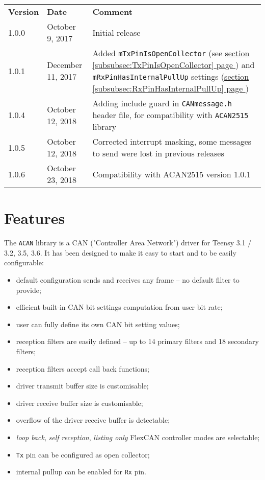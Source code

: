 \documentclass[10pt, a4paper, obeyspaces, openany]{extarticle}
\newcommand\refSubsubsectionPage[1]{\hyperref[subsubsec:#1]{section \ref*{subsubsec:#1} page \pageref{subsubsec:#1}}}
\begin{document}
\begin{center}
  \begin{tabular}{llp{10cm}}
    \textbf{Version} & \textbf{Date} & \textbf{Comment}\\
    1.0.0 & October 9, 2017 & Initial release \\
    1.0.1 & December 11, 2017 & Added \texttt{mTxPinIsOpenCollector} (see \refSubsubsectionPage{TxPinIsOpenCollector}) and \texttt{mRxPinHasInternalPullUp} settings (\refSubsubsectionPage{RxPinHasInternalPullUp}) \\
    1.0.4 & October 12, 2018 & Adding include guard in \texttt{CANmessage.h} header file, for compatibility with \texttt{ACAN2515} library\\
    1.0.5 & October 12, 2018 & Corrected interrupt masking, some messages to send were lost in previous releases \\
    1.0.6 & October 23, 2018 & Compatibility with ACAN2515 version 1.0.1
  \end{tabular}
\end{center}

\section{Features}

The \texttt{ACAN} library is a CAN ("Controller Area Network") driver for Teensy 3.1 / 3.2, 3.5, 3.6. It has been designed to make it easy to start and to be easily configurable:
\begin{itemize}
  \item default configuration sends and receives any frame -- no default filter to provide;
  \item efficient built-in CAN bit settings computation from user bit rate;
  \item user can fully define its own CAN bit setting values;
  \item reception filters are easily defined -- up to 14 primary filters and 18 secondary filters;
  \item reception filters accept call back functions;
  \item driver transmit buffer size is customisable;
  \item driver receive buffer size is customisable;
  \item overflow of the driver receive buffer is detectable;
  \item \emph{loop back}, \emph{self reception}, \emph{listing only} FlexCAN controller modes are selectable;
  \item \texttt{Tx} pin can be configured as open collector;
  \item internal pullup can be enabled for \texttt{Rx} pin.
\end{itemize}
\end{document}
